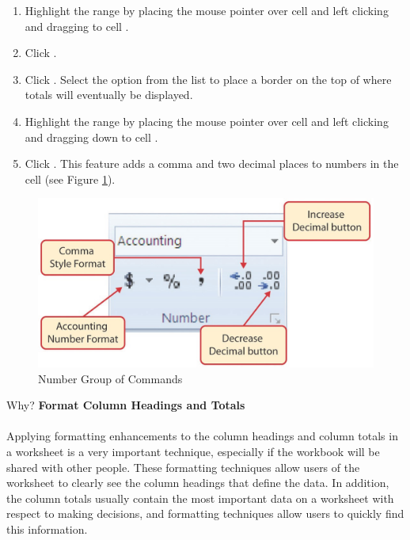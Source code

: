 \begin{enumerate}[resume]
	\item Highlight the range  by placing the mouse pointer over cell  and left clicking and dragging to cell .
	\item Click .
	\item Click . Select the  option from the list to place a border on the top of  where totals will eventually be displayed.
	\item Highlight the range  by placing the mouse pointer over cell  and left clicking and dragging down to cell .
	\item Click . This feature adds a comma and two decimal places to numbers in the cell (see Figure \ref{01:fig35}).
\end{enumerate}

\begin{figure}[H]
	\centering
	\includegraphics[width=\maxwidth{.95\linewidth}]{gfx/ch01_fig35}
	\caption{Number Group of Commands}
	\label{01:fig35}
\end{figure}

\begin{center}
	\begin{infobox}{Why?}
		\textbf{Format Column Headings and Totals}
		\\
		\\
		Applying formatting enhancements to the column headings and column totals in a worksheet is a very important technique, especially if the workbook will be shared with other people. These formatting techniques allow users of the worksheet to clearly see the column headings that define the data. In addition, the column totals usually contain the most important data on a worksheet with respect to making decisions, and formatting techniques allow users to quickly find this information.
	\end{infobox}
\end{center}


